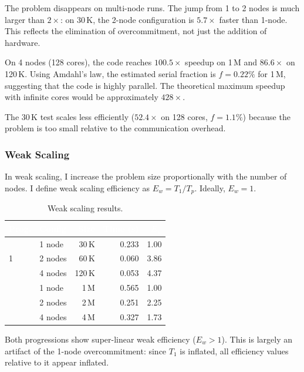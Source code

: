 \documentclass[10pt,dvipsnames,table,twocolumn]{article}
\begin{document}
The problem disappears on multi-node runs. The jump from 1 to 2 nodes is much larger than $2\times$: on 30\,K, the 2-node configuration is $5.7\times$ faster than 1-node. This reflects the elimination of overcommitment, not just the addition of hardware.

On 4 nodes (128 cores), the code reaches $100.5\times$ speedup on 1\,M and $86.6\times$ on 120\,K. Using Amdahl's law, the estimated serial fraction is $f = 0.22\%$ for 1\,M, suggesting that the code is highly parallel. The theoretical maximum speedup with infinite cores would be approximately $428\times$.

The 30\,K test scales less efficiently ($52.4\times$ on 128 cores, $f = 1.1\%$) because the problem is too small relative to the communication overhead.


\subsubsection{Weak Scaling}

In weak scaling, I increase the problem size proportionally with the number of nodes. I define weak scaling efficiency as $E_w = T_1 / T_p$. Ideally, $E_w = 1$.

\begin{table}[t]
\centering
\caption{Weak scaling results.}\label{tbl:weak}
\small
\begin{tabular}{@{}llrrr@{}}
\rowcolor{TableHead}
\textcolor{white}{\textbf{Prog.}} &
\textcolor{white}{\textbf{Config}} &
\textcolor{white}{\textbf{Size}} &
\textcolor{white}{\textbf{Time (s)}} &
\textcolor{white}{\textbf{$E_w$}} \\
\midrule
\multirow{3}{*}{1}
  & 1 node  & 30\,K  & 0.233  & 1.00 \\
  & 2 nodes & 60\,K  & 0.060  & 3.86 \\
  & 4 nodes & 120\,K & 0.053  & 4.37 \\
\midrule
\rowcolor{TableRowAlt}
\multirow{3}{*}{2}
  & 1 node  & 1\,M   & 0.565  & 1.00 \\
\rowcolor{TableRowAlt}
  & 2 nodes & 2\,M   & 0.251  & 2.25 \\
\rowcolor{TableRowAlt}
  & 4 nodes & 4\,M   & 0.327  & 1.73 \\
\bottomrule
\end{tabular}
\end{table}

Both progressions show super-linear weak efficiency ($E_w > 1$). This is largely an artifact of the 1-node overcommitment: since $T_1$ is inflated, all efficiency values relative to it appear inflated.
\end{document}
